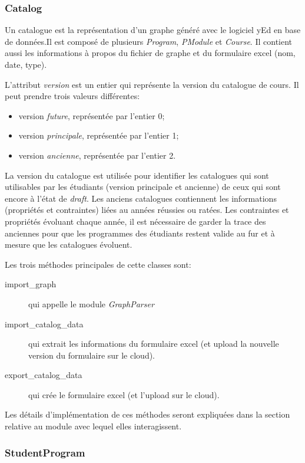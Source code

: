 \subsubsection{Catalog}

Un catalogue est la représentation d'un graphe généré avec le logiciel yEd en base de données.Il est composé de plusieurs \textit{Program}, \textit{PModule} et \textit{Course}. Il contient aussi les informations à propos du fichier de graphe et du formulaire excel (nom, date, type). 

L'attribut \textit{version} est un entier qui représente la version du catalogue de cours. Il peut prendre trois valeurs différentes:

\begin{itemize}
  \item version \textit{future}, représentée par l'entier 0;
  \item version \textit{principale}, représentée par l'entier 1;
  \item version \textit{ancienne}, représentée par l'entier 2.
\end{itemize}

La version du catalogue est utilisée pour identifier les catalogues qui sont utilisables par les étudiants (version principale et ancienne) de ceux qui sont encore à l'état de \textit{draft}. Les anciens catalogues contiennent les informations (propriétés et contraintes) liées au années réussies ou ratées. Les contraintes et propriétés évoluant chaque année, il est nécessaire de garder la trace des anciennes pour que les programmes des étudiants restent valide au fur et à mesure que les catalogues évoluent.

Les trois méthodes principales de cette classes sont:

\begin{description}
  \item[import\_graph] qui appelle le module \textit{GraphParser}
  \item[import\_catalog\_data] qui extrait les informations du formulaire excel (et upload la nouvelle version du formulaire sur le cloud).
  \item[export\_catalog\_data] qui crée le formulaire excel (et l'upload sur le cloud).
\end{description}

Les détails d'implémentation de ces méthodes seront expliquées dans la section relative au module avec lequel elles interagissent. 

\subsubsection{StudentProgram}

